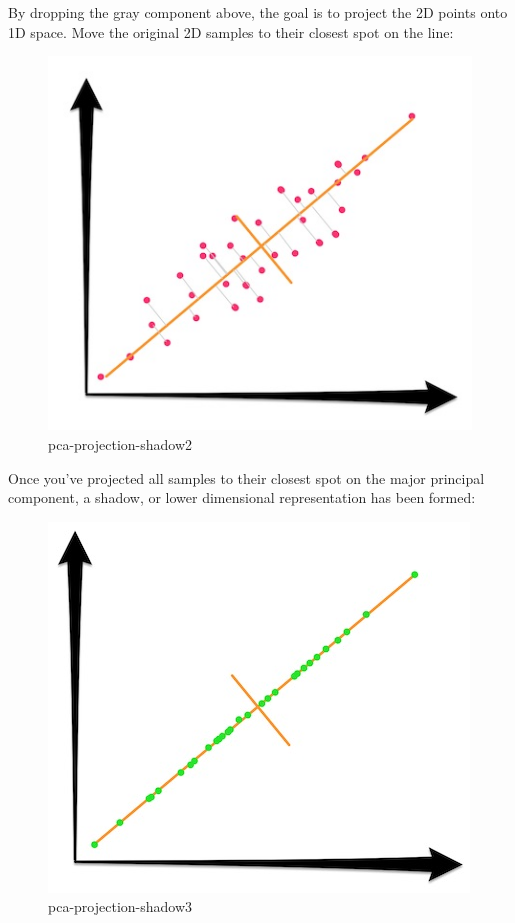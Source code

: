 \documentclass[11pt]{article}
\makeatletter
\def\maxwidth{\ifdim\Gin@nat@width>\linewidth\linewidth
    \else\Gin@nat@width\fi}
\let\Oldincludegraphics\includegraphics
\renewcommand{\includegraphics}[1]{\Oldincludegraphics[width=.8\maxwidth]{#1}}
\makeatother
\begin{document}
By dropping the gray component above, the goal is to project the 2D
points onto 1D space. Move the original 2D samples to their closest spot
on the line:

\begin{figure}
\centering
\includegraphics{pic/pca-projection-shadow2.png}
\caption{pca-projection-shadow2}
\end{figure}

Once you've projected all samples to their closest spot on the major
principal component, a shadow, or lower dimensional representation has
been formed:

\begin{figure}
\centering
\includegraphics{pic/pca-projection-shadow3.png}
\caption{pca-projection-shadow3}
\end{figure}
\end{document}
